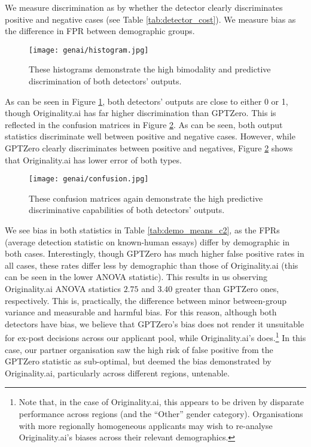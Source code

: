 We measure discrimination as by whether the detector clearly discriminates positive and negative cases (see Table \ref{tab:detector_cost}). We measure bias as the difference in FPR between demographic groups.

\begin{figure}[htb]
  \centering
  \texttt{[image: genai/histogram.jpg]}
  \caption{These histograms demonstrate the high bimodality and predictive discrimination of both detectors' outputs.}
  \label{fig:histogram}
\end{figure}

As can be seen in Figure \ref{fig:histogram}, both detectors' outputs are close to either 0 or 1, though Originality.ai has far higher discrimination than GPTZero. This is reflected in the confusion matrices in Figure \ref{fig:confusion}. As can be seen, both output statistics discriminate well between positive and negative cases. However, while GPTZero clearly discriminates between positive and negatives, Figure \ref{fig:confusion} shows that Originality.ai has lower error of both types.

\begin{figure}[htb]
  \centering
  \texttt{[image: genai/confusion.jpg]}
  \caption{These confusion matrices again demonstrate the high predictive discriminative capabilities of both detectors' outputs.}
  \label{fig:confusion}
\end{figure}

We see bias in both statistics in Table \ref{tab:demo_means_c2}, as the FPRs (average detection statistic on known-human essays) differ by demographic in both cases. Interestingly, though GPTZero has much higher false positive rates in all cases, these rates differ less by demographic than those of Originality.ai (this can be seen in the lower ANOVA statistic). This results in us observing Originality.ai ANOVA statistics $2.75$ and $3.40$ greater than GPTZero ones, respectively. This is, practically, the difference between minor between-group variance and measurable and harmful bias. For this reason, although both detectors have bias, we believe that GPTZero's bias does not render it unsuitable for ex-post decisions across our applicant pool, while Originality.ai's does.\footnote{Note that, in the case of Originality.ai, this appears to be driven by disparate performance across regions (and the ``Other'' gender category). Organisations with more regionally homogeneous applicants may wish to re-analyse Originality.ai's biases across their relevant demographics.} In this case, our partner organisation saw the high risk of false positive from the GPTZero statistic as sub-optimal, but deemed the bias demonstrated by Originality.ai, particularly across different regions, untenable.

